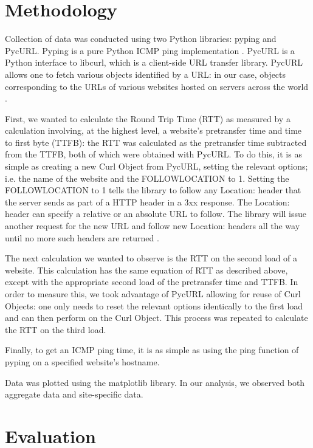 \documentclass[twocolumn, 10pt, conference]{IEEEtran}
\begin{document}
\section{Methodology}
\label{sec:methodology}


Collection of data was conducted using two Python libraries: pyping and PycURL. Pyping is a pure Python ICMP ping implementation \cite{pypingdocs}. PycURL is a Python interface to libcurl, which is a client-side URL transfer library. PycURL allows one to fetch various objects identified by a URL: in our case, objects corresponding to the URLs of various websites hosted on servers across the world \cite{pycurldocs}.

First, we wanted to calculate the Round Trip Time (RTT) as measured by a calculation involving, at the highest level, a website's pretransfer time and time to first byte (TTFB): the RTT was calculated as the pretransfer time subtracted from the TTFB, both of which were obtained with PycURL. To do this, it is as simple as creating a new Curl Object from PycURL, setting the relevant options; i.e. the name of the website and the FOLLOWLOCATION to 1. Setting the FOLLOWLOCATION to 1 tells the library to follow any Location: header that the server sends as part of a HTTP header in a 3xx response. The Location: header can specify a relative or an absolute URL to follow. The library will issue another request for the new URL and follow new Location: headers all the way until no more such headers are returned \cite{curloptfollowlocationdocs}.

The next calculation we wanted to observe is the RTT on the second load of a website. This calculation has the same equation of RTT as described above, except with the appropriate second load of the pretransfer time and TTFB. In order to measure this, we took advantage of PycURL allowing for reuse of Curl Objects: one only needs to reset the relevant options identically to the first load and can then perform on the Curl Object. This process was repeated to calculate the RTT on the third load.

Finally, to get an ICMP ping time, it is as simple as using the ping function of pyping on a specified website's hostname.

Data was plotted using the matplotlib library. In our analysis, we observed both aggregate data and site-specific data.

\section{Evaluation}
\label{sec:evaluation}
\end{document}
